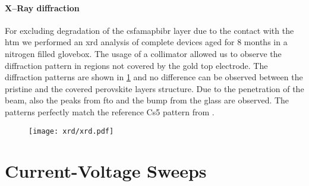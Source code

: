 	\paragraph{X--Ray diffraction}
For excluding degradation of the \gls{csfamapbibr} layer due to the contact with the \gls{htm} we performed an \gls{xrd} analysis of complete devices aged for 8 months in a nitrogen filled glovebox.
The usage of a collimator allowed us to observe the diffraction pattern in regions not covered by the gold top electrode.
The diffraction patterns are shown in \cref{fig:tae_xrd} and no difference can be observed between the pristine and the covered perovskite layers structure.
Due to the penetration of the beam, also the peaks from \gls{fto} and the bump from the glass are observed.
The patterns perfectly match the reference Cs5 pattern from .

	\begin{figure}
		\centering
		\texttt{[image: xrd/xrd.pdf]}
		\label{fig:tae_xrd}
	\end{figure}


\section{Current-Voltage Sweeps}

